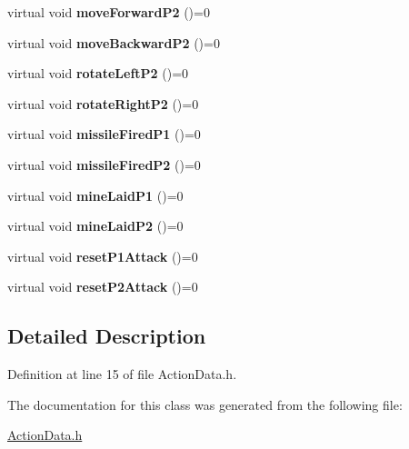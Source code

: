 \begin{DoxyCompactItemize}
\item 
\hypertarget{class_action_data_a30c547419564c80e3764b620bb1833cc}{virtual void {\bfseries move\+Forward\+P2} ()=0}\label{class_action_data_a30c547419564c80e3764b620bb1833cc}

\item 
\hypertarget{class_action_data_a9914514aed490cdf131f4a4be4d0f411}{virtual void {\bfseries move\+Backward\+P2} ()=0}\label{class_action_data_a9914514aed490cdf131f4a4be4d0f411}

\item 
\hypertarget{class_action_data_aa67078569c7aa6f0f39449c2e9d20abf}{virtual void {\bfseries rotate\+Left\+P2} ()=0}\label{class_action_data_aa67078569c7aa6f0f39449c2e9d20abf}

\item 
\hypertarget{class_action_data_aae9de974e0b844d04eec06087d867246}{virtual void {\bfseries rotate\+Right\+P2} ()=0}\label{class_action_data_aae9de974e0b844d04eec06087d867246}

\item 
\hypertarget{class_action_data_aeb7f1219ff0bf0cc81fee1d669317cdb}{virtual void {\bfseries missile\+Fired\+P1} ()=0}\label{class_action_data_aeb7f1219ff0bf0cc81fee1d669317cdb}

\item 
\hypertarget{class_action_data_a5a2d45d0fc03daf8edaacd6a9757fafd}{virtual void {\bfseries missile\+Fired\+P2} ()=0}\label{class_action_data_a5a2d45d0fc03daf8edaacd6a9757fafd}

\item 
\hypertarget{class_action_data_a8abc4e84c4e6d676010c7e2497278312}{virtual void {\bfseries mine\+Laid\+P1} ()=0}\label{class_action_data_a8abc4e84c4e6d676010c7e2497278312}

\item 
\hypertarget{class_action_data_a71c04f577d3c06aa45b7c43d935ca567}{virtual void {\bfseries mine\+Laid\+P2} ()=0}\label{class_action_data_a71c04f577d3c06aa45b7c43d935ca567}

\item 
\hypertarget{class_action_data_a12925d051a1cd40bddcb18f0be2c2b01}{virtual void {\bfseries reset\+P1\+Attack} ()=0}\label{class_action_data_a12925d051a1cd40bddcb18f0be2c2b01}

\item 
\hypertarget{class_action_data_ab8a96447019bfc7a275903dfa42cfcf5}{virtual void {\bfseries reset\+P2\+Attack} ()=0}\label{class_action_data_ab8a96447019bfc7a275903dfa42cfcf5}

\end{DoxyCompactItemize}


\subsection{Detailed Description}


Definition at line 15 of file Action\+Data.\+h.



The documentation for this class was generated from the following file\+:\begin{DoxyCompactItemize}
\item 
\hyperlink{_action_data_8h}{Action\+Data.\+h}\end{DoxyCompactItemize}
